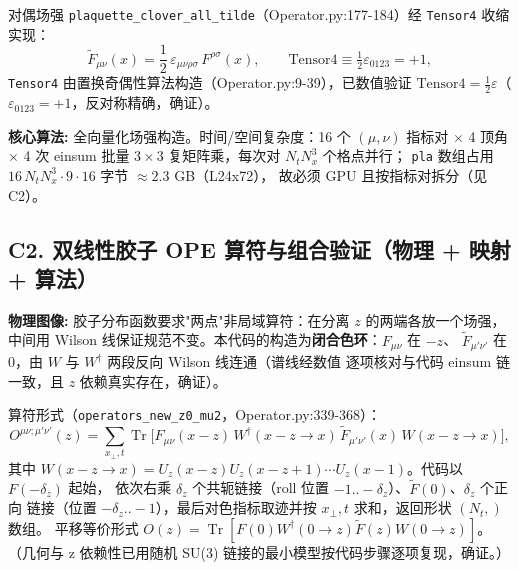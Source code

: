 \documentclass[UTF8]{ctexart}
\begin{document}
对偶场强 \texttt{\nolinkurl{plaquette_clover_all_tilde}}（Operator.py:177-184）经
\texttt{Tensor4} 收缩实现：
\begin{equation}\label{eq:dual}
\tilde F_{\mu\nu}(x)=\frac{1}{2}\,\varepsilon_{\mu\nu\rho\sigma}\,F^{\rho\sigma}(x),
\qquad \text{Tensor4}\equiv\tfrac12\varepsilon_{0123}{=+1},
\end{equation}
\texttt{Tensor4} 由置换奇偶性算法构造（Operator.py:9-39），已数值验证
$\text{Tensor4}=\tfrac12\varepsilon$（$\varepsilon_{0123}=+1$，反对称精确，\textcolor{accent}{确证}）。

\begin{algobox}
\textbf{核心算法:} 全向量化场强构造。时间/空间复杂度：16 个 $(\mu,\nu)$ 指标对 $\times$ 4 顶角
$\times$ 4 次 einsum 批量 $3\times3$ 复矩阵乘，每次对 $N_t N_x^3$ 个格点并行；
\texttt{pla} 数组占用 $16\,N_tN_x^3\cdot 9\cdot 16$ 字节 $\approx 2.3$ GB（L24x72），
故必须 GPU 且按指标对拆分（见 C2）。
\end{algobox}

\subsection{C2. 双线性胶子 OPE 算符与组合验证（物理 + 映射 + 算法）}

\begin{physbox}
\textbf{物理图像:} 胶子分布函数要求"两点"非局域算符：在分离 $z$ 的两端各放一个场强，
中间用 Wilson 线保证规范不变。本代码的构造为\textbf{闭合色环}：$F_{\mu\nu}$ 在 $-z$、
$\tilde F_{\mu'\nu'}$ 在 $0$，由 $W$ 与 $W^\dagger$ 两段反向 Wilson 线连通（谱线经数值
逐项核对与代码 einsum 链一致，且 $z$ 依赖真实存在，\textcolor{accent}{确证}）。
\end{physbox}

算符形式（\texttt{\nolinkurl{operators_new_z0_mu2}}，Operator.py:339-368）：
\begin{equation}\label{eq:bilocal}
O^{\mu\nu;\mu'\nu'}(z)=\sum_{x_\perp,t}\operatorname{Tr}\Big[
F_{\mu\nu}(x-z)\,W^\dagger(x{-}z\to x)\,\tilde F_{\mu'\nu'}(x)\,W(x{-}z\to x)\Big],
\end{equation}
其中 $W(x{-}z\to x)=U_z(x{-}z)U_z(x{-}z{+}1)\cdots U_z(x{-}1)$。代码以 $F(-\delta_z)$ 起始，
依次右乘 $\delta_z$ 个共轭链接（roll 位置 $-1..-\delta_z$）、$\tilde F(0)$、$\delta_z$ 个正向
链接（位置 $-\delta_z..-1$），最后对色指标取迹并按 $x_\perp,t$ 求和，返回形状 $(N_t,)$ 数组。
平移等价形式 $O(z)=\operatorname{Tr}[F(0)W^\dagger(0{\to}z)\tilde F(z)W(0{\to}z)]$。
（几何与 z 依赖性已用随机 SU(3) 链接的最小模型按代码步骤逐项复现，\textcolor{accent}{确证}。）
\end{document}
